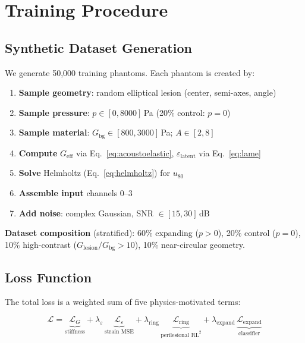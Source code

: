 \documentclass[11pt,letterpaper]{article}
\newcommand{\Geff}{G_{\mathrm{eff}}}
\newcommand{\Gbg}{G_{\mathrm{bg}}}
\newcommand{\eps}{\varepsilon_{\mathrm{latent}}}
\begin{document}
\section{Training Procedure}

\subsection{Synthetic Dataset Generation}

We generate 50,000 training phantoms. Each phantom is created by:
\begin{enumerate}[leftmargin=2em]
    \item \textbf{Sample geometry}: random elliptical lesion (center, semi-axes, angle)
    \item \textbf{Sample pressure}: $p \in [0, 8000]$\,Pa (20\% control: $p=0$)
    \item \textbf{Sample material}: $\Gbg \in [800, 3000]$\,Pa; $A \in [2, 8]$
    \item \textbf{Compute} $\Geff$ via Eq.~\eqref{eq:acoustoelastic}, $\eps$ via Eq.~\eqref{eq:lame}
    \item \textbf{Solve} Helmholtz (Eq.~\eqref{eq:helmholtz}) for $u_{80}$
    \item \textbf{Assemble input} channels 0--3
    \item \textbf{Add noise}: complex Gaussian, SNR $\in [15, 30]$\,dB
\end{enumerate}

\textbf{Dataset composition} (stratified):
60\% expanding ($p > 0$), 20\% control ($p = 0$), 10\% high-contrast
($G_{\mathrm{lesion}} / \Gbg > 10$), 10\% near-circular geometry.

\subsection{Loss Function}

The total loss is a weighted sum of five physics-motivated terms:

\begin{keybox}
\begin{equation}\label{eq:loss}
    \mathcal{L} = \underbrace{\mathcal{L}_G}_{\text{stiffness}}
    + \lambda_\varepsilon\,\underbrace{\mathcal{L}_\varepsilon}_{\text{strain MSE}}
    + \lambda_{\mathrm{ring}}\,\underbrace{\mathcal{L}_{\mathrm{ring}}}_{\text{perilesional RL}^2}
    + \lambda_{\mathrm{expand}}\,\underbrace{\mathcal{L}_{\mathrm{expand}}}_{\text{classifier}}
\end{equation}
\end{keybox}
\end{document}

